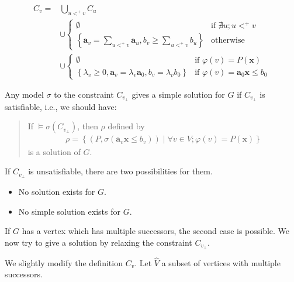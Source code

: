 \documentclass[a4paper,12pt]{article}
\begin{document}
\begin{align*}
C_v = & \bigcup_{u <^+ v} C_u
\\
& \cup \begin{cases}
\emptyset
& \mbox{if } \nexists u; u <^+ v \\
\left\lbrace
 \mathbf{a}_v = \sum_{u <^+ v} \mathbf{a}_u,
 b_v \geq \sum_{u <^+ v} b_u
\right\rbrace
& \mbox{otherwise}
\end{cases}
\\
& \cup \begin{cases}
\emptyset
& \mbox{if } \varphi(v) = P(\mathbf{x}) \\
\left\lbrace
 \lambda_v \geq 0, \mathbf{a}_v = \lambda_v \mathbf{a}_0,
 b_v = \lambda_v b_0
\right\rbrace
& \mbox{if } \varphi(v) = \mathbf{a}_0 \mathbf{x} \leq b_0
\end{cases}
\end{align*}

Any model $\sigma$ to the constraint $C_{v_\bot}$ gives a simple
solution for $G$ if $C_{v_\bot}$ is satisfiable, i.e., we should have:

\begin{quote}
If $\models \sigma(C_{v_\bot})$, then $\rho$ defined by
\begin{align*}
 \rho = \left\lbrace
  \left( P, \sigma(\mathbf{a}_v \mathbf{x} \leq b_v) \right) \middle|
  \forall v \in V; \varphi(v) = P(\mathbf{x})
 \right\rbrace
\end{align*}
is a solution of $G$.
\end{quote}

If $C_{v_\bot}$ is unsatisfiable, there are two possibilities for them.

\begin{itemize}
\item No solution exists for $G$.
\item No simple solution exists for $G$.
\end{itemize}

If $G$ has a vertex which has multiple successors, the second case is
possible. We now try to give a solution by relaxing the constraint
$C_{v_\bot}$.

We slightly modify the definition $C_v$. Let $\hat V$ a subset of
vertices with multiple successors.
\end{document}
